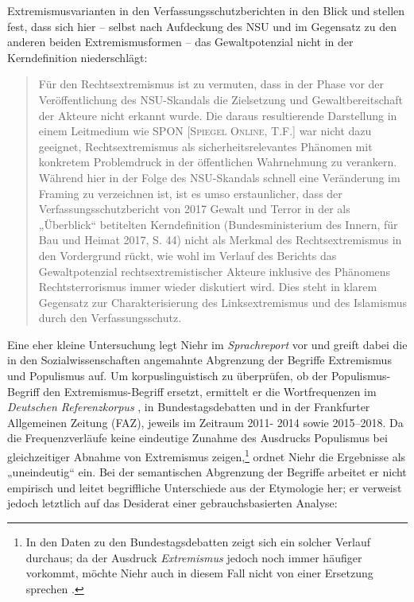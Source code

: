 Extremismusvarianten in den Verfassungsschutzberichten in den Blick und stellen fest, dass sich hier -- selbst nach Aufdeckung des NSU und im Gegensatz zu den anderen beiden Extremismusformen -- das Gewaltpotenzial nicht in der Kerndefinition niederschlägt:

\begin{quote}
Für den Rechtsextremismus ist zu vermuten, dass in der Phase vor der Veröffentlichung des NSU-Skandals die Zielsetzung und Gewaltbereitschaft der Akteure nicht erkannt wurde. Die daraus resultierende Darstellung in einem Leitmedium wie SPON [\textsc{Spiegel Online}, T.F.] war nicht dazu geeignet, Rechtsextremismus als sicherheitsrelevantes Phänomen mit konkretem Problemdruck in der öffentlichen Wahrnehmung zu verankern. Während hier in der Folge des NSU-Skandals schnell eine Veränderung im Framing zu verzeichnen ist, ist es umso erstaunlicher, dass der Verfassungsschutzbericht von 2017 Gewalt und Terror in der als „Überblick`` betitelten Kerndefinition (Bundesministerium des Innern, für Bau und Heimat 2017, S. 44) nicht als Merkmal des Rechtsextremismus in den Vordergrund rückt, wie wohl im Verlauf des Berichts das Gewaltpotenzial rechtsextremistischer Akteure inklusive des Phänomens Rechtsterrorismus immer wieder diskutiert wird. Dies steht in klarem Gegensatz zur Charakterisierung des Linksextremismus und des Islamismus durch den Verfassungsschutz. \autocite[39-40]{czuloEinflussExtremistischerGewaltereignisse2020}
\end{quote}

Eine eher kleine Untersuchung legt Niehr \autocite*{niehrPopulismusExtremismusHeute2019} im \emph{Sprachreport} vor und greift dabei die in den Sozialwissenschaften angemahnte Abgrenzung der Begriffe Extremismus und Populismus \autocite[54-55]{jesseGrundlagen2018} auf. Um korpuslinguistisch zu überprüfen, ob der Populismus-Begriff den Extremismus-Begriff ersetzt, ermittelt er die Wortfrequenzen im \emph{Deutschen Referenzkorpus} \autocite[DeReKo;][]{kupietzGermanReferenceCorpus2018}, in Bundestagsdebatten und in der Frankfurter Allgemeinen Zeitung (FAZ), jeweils im Zeitraum 2011- 2014 sowie 2015--2018. Da die Frequenzverläufe keine eindeutige Zunahme des Ausdrucks Populismus bei gleichzeitiger Abnahme von Extremismus zeigen,\footnote{In den Daten zu den Bundestagsdebatten zeigt sich ein solcher Verlauf durchaus; da der Ausdruck \emph{Extremismus} jedoch noch immer häufiger vorkommt, möchte Niehr auch in diesem Fall nicht von einer Ersetzung sprechen \autocite[28]{niehrPopulismusExtremismusHeute2019}.} ordnet Niehr die Ergebnisse als „uneindeutig`` \autocite*[27]{niehrPopulismusExtremismusHeute2019} ein. Bei der semantischen Abgrenzung der Begriffe arbeitet er nicht empirisch und leitet begriffliche Unterschiede aus der Etymologie her; er verweist jedoch letztlich auf das Desiderat einer gebrauchsbasierten Analyse:

